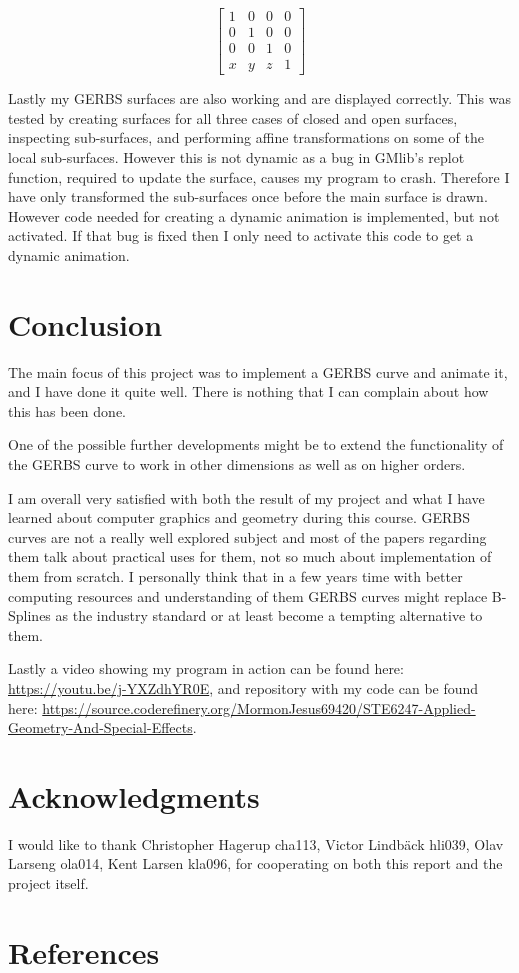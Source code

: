\documentclass[a4paper,12pt]{extarticle}
\begin{document}
\begin{equation}
\begin{bmatrix}
1&0&0&0\\
0&1&0&0\\
0&0&1&0\\
x&y&z&1
\end{bmatrix}
\label{eq:TranslationMatrix}
\end{equation}

Lastly my GERBS surfaces are also working and are displayed correctly. This was tested by creating surfaces for all three cases of closed and open surfaces, inspecting sub-surfaces, and performing affine transformations on some of the local sub-surfaces. However this is not dynamic as a bug in GMlib's replot function, required to update the surface, causes my program to crash. Therefore I have only transformed the sub-surfaces once before the main surface is drawn. However code needed for creating a dynamic animation is implemented, but not activated. If that bug is fixed then I only need to activate this code to get a dynamic animation.

\section{Conclusion}
The main focus of this project was to implement a GERBS curve and animate it, and I have done it quite well. There is nothing that I can complain about how this has been done.

One of the possible further developments might be to extend the functionality of the GERBS curve to work in other dimensions as well as on higher orders.

I am overall very satisfied with both the result of my project and what I have learned about computer graphics and geometry during this course. GERBS curves are not a really well explored subject and most of the papers regarding them talk about practical uses for them, not so much about implementation of them from scratch. I personally think that in a few years time with better computing resources and understanding of them GERBS curves might replace B-Splines as the industry standard or at least become a tempting alternative to them.

Lastly a video showing my program in action can be found here: \url{https://youtu.be/j-YXZdhYR0E}, and repository with my code can be found here: \url{https://source.coderefinery.org/MormonJesus69420/STE6247-Applied-Geometry-And-Special-Effects}.

\section{Acknowledgments}
I would like to thank Christopher Hagerup cha113, Victor Lindb\"{a}ck hli039, Olav Larseng ola014, Kent Larsen kla096, for cooperating on both this report and the project itself.
 
\section{References}
\begingroup
\def\section*#1{}


\endgroup
\end{document}
